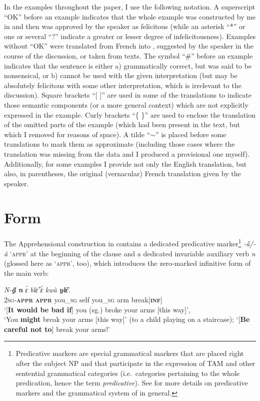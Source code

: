 \documentclass[output=paper,colorlinks,citecolor=brown]{langscibook}
\begin{document}
In the examples throughout the paper, I use the following notation. A superscript ``OK'' before an example indicates that the whole example was constructed by me in  and then was approved by the speaker as felicitous (while an asterisk ``*'' or one or several ``?'' indicate a greater or lesser degree of infelicitousness). Examples without ``OK'' were translated from French into , suggested by the speaker in the course of the discussion, or taken from texts. The symbol ``\#'' before an example indicates that the sentence is either a) grammatically correct, but was said to be nonsensical, or b) cannot be used with the given interpretation (but may be absolutely felicitous with some other interpretation, which is irrelevant to the discussion). Square brackets ``[ ]'' are used in some of the translations to indicate those semantic components (or a more general context) which are not explicitly expressed in the example. Curly brackets ``\{ \}'' are used to enclose the translation of the omitted parts of the example (which had been present in the  text, but which I removed for reasons of space). A tilde ``$\sim$'' is placed before some translations to mark them as approximate (including those cases where the translation was missing from the data and I produced a provisional one myself). Additionally, for some examples I provide not only the English translation, but also, in parentheses, the original (vernacular) French translation given by the speaker.


\section{Form}
\largerpage
\label{sec:fedotov:form}

The Apprehensional construction in  contains a dedicated predicative marker\footnote{Predicative markers are special grammatical markers that are placed right after the subject NP and that participate in the expression of TAM and other sentential grammatical categories (i.e.\ categories pertaining to the whole predication, hence the term \textit{predicative}). See  for more details on predicative markers and the grammatical system of  in general.} \textit{-a̋/-ǎ} `\textsc{appr}' at the beginning of the clause and a dedicated invariable auxiliary verb \textit{n{\ù}} (glossed here as `\textsc{appr}', too), which introduces the zero-marked infinitive form of the main verb:

\ea \label{ex:Fed4}
\gll \textit{N-\textbf{a̰̋}} \textit{\textbf{n{\ù}}} \textit{ɛ̀} \textit{blɛ̋} \textit{ɛ̀} \textit{kwà} \textit{\textbf{ylɛ̏}.} \\
\textsc{2sg-\textbf{appr}} \textsc{\textbf{appr}} you\_\textsc{sg} self you\_\textsc{sg} arm break[\textsc{\textbf{inf}}] \\
\glt `[\textbf{It would be bad if}] you (sg.) broke your arms [this way]', \\
`You \textbf{might} break your arms [this way]' (to a child playing on a staircase); `[\textbf{Be careful not to}] break your arms!'
\z
\end{document}
